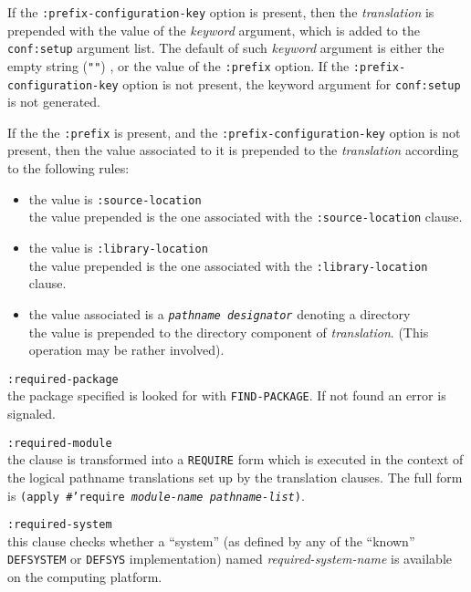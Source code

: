 \documentclass[a4paper]{article}
\newcommand{\notimpl}{\ddag}
\newcommand{\code}[1]{\texttt{#1}}
\newcommand{\clhsterm}[1]{\texttt{\textit{#1}}} %
\begin{document}
\begin{description}
	If the \code{:prefix-configuration-key} option is present,
	then the \emph{translation} is prepended with the value of the
	\emph{keyword} argument, which is added to the
	\code{conf:setup} argument list.  The default of such
	\emph{keyword} argument is either the empty string (\code{""})
	\notimpl, or the value of the \code{:prefix} option.
	If the \code{:prefix-configuration-key} option is not present,
	the keyword argument for \code{conf:setup} is not generated.

	If the the \code{:prefix} is present, and the
	\code{:prefix-configuration-key} option is not present, then
	the value associated to it is prepended to the
	\emph{translation} according to the following rules:
	\begin{itemize}
	\item	the value is \code{:source-location}\\
		the value prepended is the one associated with the
		\code{:source-location} clause.
	\item	the value is \code{:library-location}\\
		the value prepended is the one associated with the
		\code{:library-location} clause.
	\item	the value associated is a \clhsterm{pathname
		designator} denoting a directory\\
		the value is prepended to the directory component of
		\emph{translation}. (This operation may be rather involved).
	\end{itemize}

\item	\code{:required-package}\\
	the package specified is looked for with \code{FIND-PACKAGE}.
	If not found an error is signaled.

\item	\code{:required-module}\\
	the clause is transformed into a \code{REQUIRE} form which is
	executed in the context of the logical pathname translations
	set up by the translation clauses.  The full form is
	\code{(apply \#'require \emph{module-name} \emph{pathname-list})}.
	
\item	\code{:required-system}\\
	this clause checks whether a ``system'' (as defined by any of
	the ``known'' \code{DEFSYSTEM} or \code{DEFSYS}
	implementation) named \emph{required-system-name} is
	available on the computing platform.


\end{description}
\end{document}

